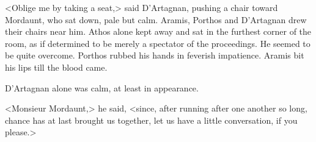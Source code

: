 <Oblige me by taking a seat,> said D'Artagnan, pushing a chair toward Mordaunt, who sat down, pale but calm. Aramis, Porthos and D'Artagnan drew their chairs near him. Athos alone kept away and sat in the furthest corner of the room, as if determined to be merely a spectator of the proceedings. He seemed to be quite overcome. Porthos rubbed his hands in feverish impatience. Aramis bit his lips till the blood came.

D'Artagnan alone was calm, at least in appearance.

<Monsieur Mordaunt,> he said, <since, after running after one another so long, chance has at last brought us together, let us have a little conversation, if you please.> 